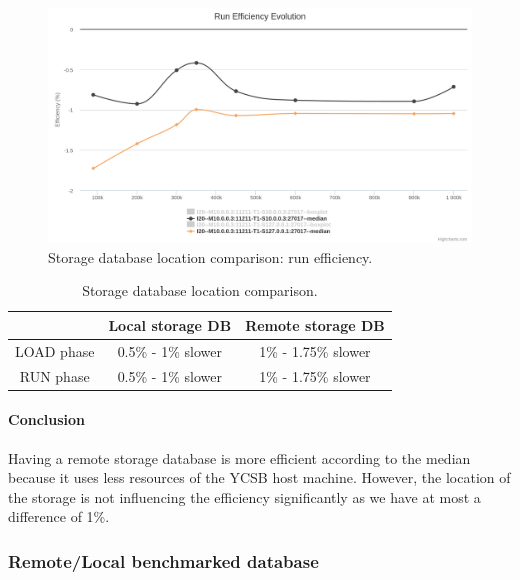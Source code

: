 \documentclass[a4paper,11pt]{report}
\begin{document}
\begin{figure}[ht]
\begin{center}
\includegraphics[width=1\linewidth]{images/evaluation/storage-T1-Mremote-run.png}
\caption{Storage database location comparison: run efficiency.}
\label{storage-T1-Mremote-run}
\end{center}
\end{figure}

\begin{table}[ht]
\begin{center}
	\begin{tabular}{|c|c|c|}
		\hline
		  & Local storage DB & Remote storage DB \\
		\hline
	   	LOAD phase & 0.5\% - 1\% slower & 1\% - 1.75\% slower \\
	   	RUN phase & 0.5\% - 1\% slower & 1\% - 1.75\% slower \\
	    \hline
	\end{tabular}
	\caption{Storage database location comparison.}
\label{storage-table}
\end{center}
\end{table}


\paragraph{Conclusion}

Having a remote storage database is more efficient according to the median because it uses less resources of the YCSB host machine. However, the location of the storage is not influencing the efficiency significantly as we have at most a difference of 1\%.

\clearpage

\subsubsection{Remote/Local benchmarked database}\label{memcached_evaluation}
\end{document}
